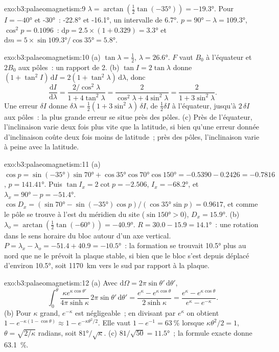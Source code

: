 \begin{solution}{exo:b3:palaeomagnetism:9}
$\lambda = \arctan(\tfrac12\tan(\ang{-35})) = \ang{-19.3}$. Pour $I = \ang{-40}$
et \ang{-30}~: \ang{-22.8} et \ang{-16.1}, un intervalle de \ang{6.7}.
$p = \ang{90} - \lambda = \ang{109.3}$, $\cos^2p = 0.1096$~:
$\mathrm dp = 2.5\times(1 + 0.329) = \ang{3.3}$ et $\mathrm dm =
5\times\sin\ang{109.3}/\cos\ang{35} = \ang{5.8}$.
\end{solution}

\begin{solution}{exo:b3:palaeomagnetism:10}
(a) $\tan\lambda = \tfrac12$, $\lambda = \ang{26.6}$. $F$ vaut $B_0$ à
l'équateur et $2B_0$ aux pôles~: un rapport de 2. (b) $\tan I = 2\tan\lambda$
donne $(1 + \tan^2I)\,\mathrm dI = 2(1 + \tan^2\lambda)\,\mathrm d\lambda$, donc
\[
  \frac{\mathrm dI}{\mathrm d\lambda} = \frac{2/\cos^2\lambda}{1 + 4\tan^2\lambda}
  = \frac{2}{\cos^2\lambda + 4\sin^2\lambda} = \frac{2}{1 + 3\sin^2\lambda}.
\]
Une erreur $\delta I$ donne $\delta\lambda = \tfrac12(1 + 3\sin^2\lambda)\,\delta I$,
de $\tfrac12\delta I$ à l'équateur, jusqu'à $2\,\delta I$ aux pôles~: la
plus grande erreur se situe près des pôles. (c) Près de l'équateur, l'inclinaison varie
deux fois plus vite que la latitude, si bien qu'une erreur donnée d'inclinaison coûte
deux fois moins de latitude~; près des pôles, l'inclinaison varie à peine avec la latitude.
\end{solution}

\begin{solution}{exo:b3:palaeomagnetism:11}
(a) $\cos p = \sin(\ang{-35})\sin\ang{70} + \cos\ang{35}\cos\ang{70}\cos\ang{150}
= -0.5390 - 0.2426 = -0.7816$, $p = \ang{141.41}$. Puis $\tan I_x = 2\cot p =
-2.506$, $I_x = \ang{-68.2}$, et $\lambda_x = \ang{90} - p = \ang{-51.4}$.
$\cos D_x = (\sin\ang{70} - \sin(\ang{-35})\cos p)/(\cos\ang{35}\sin p) =
0.9617$, et comme le pôle se trouve à l'est du méridien du site ($\sin\ang{150} >
0$), $D_x = \ang{15.9}$. (b) $\lambda_o = \arctan(\tfrac12\tan(\ang{-60})) =
\ang{-40.9}$. $R = 30.0 - 15.9 = \ang{14.1}$~: une rotation dans le sens horaire du bloc
autour d'un axe vertical. $P = \lambda_x - \lambda_o = -51.4 + 40.9 =
\ang{-10.5}$~: la formation se trouvait \ang{10.5} plus au nord que ne le
prévoit la plaque stable, si bien que le bloc s'est depuis déplacé d'environ \ang{10.5}, soit
\qty{1170}{km} vers le sud par rapport à la plaque.
\end{solution}

\begin{solution}{exo:b3:palaeomagnetism:12}
(a) Avec $\mathrm d\Omega = 2\pi\sin\theta'\,\mathrm d\theta'$,
\[
  \int_0^\theta\frac{\kappa e^{\kappa\cos\theta'}}{4\pi\sinh\kappa}\,2\pi\sin\theta'\,
  \mathrm d\theta' = \frac{e^\kappa - e^{\kappa\cos\theta}}{2\sinh\kappa}
  = \frac{e^\kappa - e^{\kappa\cos\theta}}{e^\kappa - e^{-\kappa}} .
\]
(b) Pour $\kappa$ grand, $e^{-\kappa}$ est négligeable~; en divisant par $e^\kappa$
on obtient $1 - e^{-\kappa(1 - \cos\theta)} \approx 1 - e^{-\kappa\theta^2/2}$. Elle
vaut $1 - e^{-1} = \qty{63}{\percent}$ lorsque $\kappa\theta^2/2 = 1$, $\theta =
\sqrt{2/\kappa}$ radians, soit $\ang{81}/\sqrt\kappa$. (c) $81/\sqrt{50} =
\ang{11.5}$~; la formule exacte donne \qty{63.1}{\percent}.
\end{solution}

